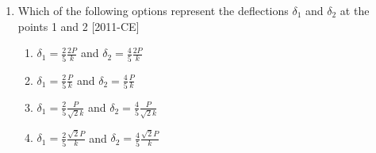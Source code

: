 \documentclass[journal,12pt,onecolumn]{IEEEtran}
\theoremstyle{remark}
\begin{document}
\begin{enumerate}
\begin{figure}[!ht]
\label{fig:my_label}
\end{figure}

\item Which of the following options represent the deflections $\delta_{1}$ and $\delta_{2}$ at the points 1 and 2 \hfill{[2011-CE]}

\begin{enumerate}
    \item $\delta_1 = \frac{2}{5} \frac{2P}{k}$ and $\delta_2 = \frac{4}{5} \frac{2P}{k}$
    \item $\delta_1 = \frac{2}{5} \frac{P}{k}$ and $\delta_2 = \frac{4}{5} \frac{P}{k}$
    \item $\delta_1 = \frac{2}{5} \frac{P}{\sqrt{2}k}$ and $\delta_2 = \frac{4}{5} \frac{P}{\sqrt{2}k}$
    \item $\delta_1 = \frac{2}{5} \frac{\sqrt{2}P}{k}$ and $\delta_2 = \frac{4}{5} \frac{\sqrt{2}P}{k}$
\end{enumerate}
    




    
\end{enumerate}
\end{document}
